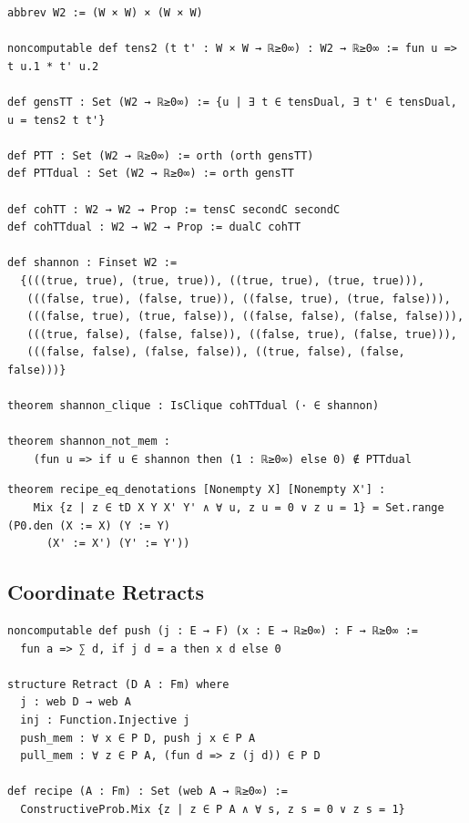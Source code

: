 \label{lean:tensorgap-bool}
\begin{lstlisting}
abbrev W2 := (W × W) × (W × W)

noncomputable def tens2 (t t' : W × W → ℝ≥0∞) : W2 → ℝ≥0∞ := fun u => t u.1 * t' u.2

def gensTT : Set (W2 → ℝ≥0∞) := {u | ∃ t ∈ tensDual, ∃ t' ∈ tensDual, u = tens2 t t'}

def PTT : Set (W2 → ℝ≥0∞) := orth (orth gensTT)
def PTTdual : Set (W2 → ℝ≥0∞) := orth gensTT

def cohTT : W2 → W2 → Prop := tensC secondC secondC
def cohTTdual : W2 → W2 → Prop := dualC cohTT

def shannon : Finset W2 :=
  {(((true, true), (true, true)), ((true, true), (true, true))),
   (((false, true), (false, true)), ((false, true), (true, false))),
   (((false, true), (true, false)), ((false, false), (false, false))),
   (((true, false), (false, false)), ((false, true), (false, true))),
   (((false, false), (false, false)), ((true, false), (false, false)))}

theorem shannon_clique : IsClique cohTTdual (· ∈ shannon)

theorem shannon_not_mem :
    (fun u => if u ∈ shannon then (1 : ℝ≥0∞) else 0) ∉ PTTdual
\end{lstlisting}

\label{lean:proglang-eq}
\begin{lstlisting}
theorem recipe_eq_denotations [Nonempty X] [Nonempty X'] :
    Mix {z | z ∈ tD X Y X' Y' ∧ ∀ u, z u = 0 ∨ z u = 1} = Set.range (P0.den (X := X) (Y := Y)
      (X' := X') (Y' := Y'))
\end{lstlisting}

\subsection{Coordinate Retracts}

\label{lean:retract}
\begin{lstlisting}
noncomputable def push (j : E → F) (x : E → ℝ≥0∞) : F → ℝ≥0∞ :=
  fun a => ∑ d, if j d = a then x d else 0

structure Retract (D A : Fm) where
  j : web D → web A
  inj : Function.Injective j
  push_mem : ∀ x ∈ P D, push j x ∈ P A
  pull_mem : ∀ z ∈ P A, (fun d => z (j d)) ∈ P D

def recipe (A : Fm) : Set (web A → ℝ≥0∞) :=
  ConstructiveProb.Mix {z | z ∈ P A ∧ ∀ s, z s = 0 ∨ z s = 1}
\end{lstlisting}

